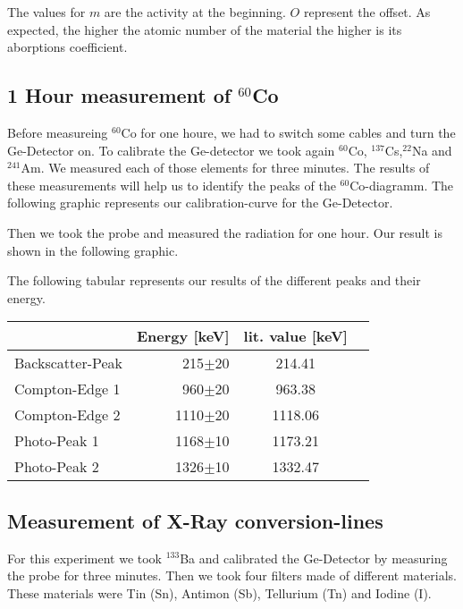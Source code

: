 The values for $m$ are the activity at the beginning. $O$ represent the offset. As expected, the higher the atomic number of the material the higher is its aborptions coefficient.

\newpage
\subsection{1 Hour measurement of $^{60}$Co}
Before measureing $^{60}$Co for one houre, we had to switch some cables and turn the Ge-Detector on. To calibrate the Ge-detector we took again $^{60}$Co, $^{137}$Cs,$^{22}$Na and $^{241}$Am. We measured each of those elements for three minutes. The results of these measurements will help us to identify the peaks of the $^{60}$Co-diagramm. The following graphic represents our calibration-curve for the Ge-Detector.



Then we took the probe and measured the radiation for one hour. Our result is shown in the following graphic.


The following tabular represents our results of the different peaks and their energy.
\\

\begin{tabular}{l|r|c|l}
& Energy [keV] & lit. value [keV] & \\
\hline
Backscatter-Peak & 215$\pm$20& 214.41	\\
Compton-Edge 1 & 960$\pm$20 & 963.38 	\\
Compton-Edge 2 & 1110$\pm$20 & 1118.06 	\\
Photo-Peak 1 & 1168$\pm$10 & 1173.21 	\\
Photo-Peak 2 & 1326$\pm$10 & 1332.47 	\\
\end{tabular}

\subsection{Measurement of X-Ray conversion-lines}
For this experiment we took $^{133}$Ba and calibrated the Ge-Detector by measuring the probe for three minutes. Then we took four filters made of different materials. These materials were Tin (Sn), Antimon (Sb),  Tellurium (Tn) and Iodine (I).

